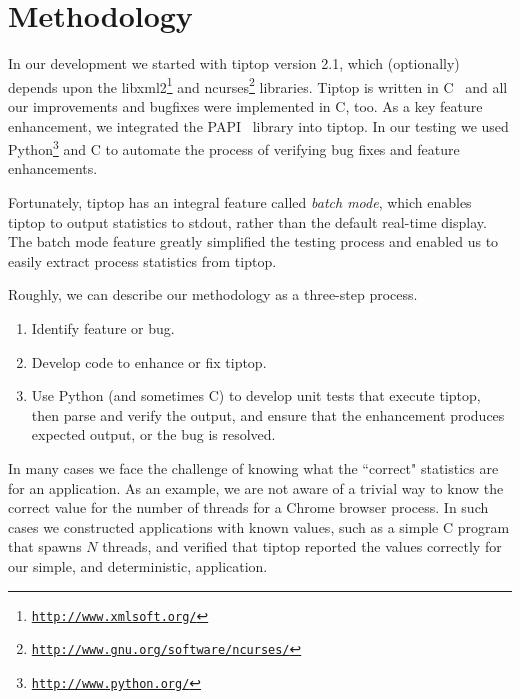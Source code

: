\section{Methodology}
\label{sec:methodology}
In our development we started with tiptop version 2.1, which (optionally) depends upon the libxml2\footnote{\texttt{\url{http://www.xmlsoft.org/}}} and ncurses\footnote{\texttt{\url{http://www.gnu.org/software/ncurses/}}} libraries.
Tiptop is written in C~\cite{Kernighan:1988:CPL:576122} and all our improvements and bugfixes were implemented in C, too.
As a key feature enhancement, we integrated the PAPI~\cite{Mucci99papi:a} library into tiptop.
In our testing we used Python\footnote{\texttt{\url{http://www.python.org/}}} and C to automate the process of verifying bug fixes and feature enhancements.

Fortunately, tiptop has an integral feature called \emph{batch mode}, which enables tiptop to output statistics to stdout, rather than the default real-time display.
The batch mode feature greatly simplified the testing process and enabled us to easily extract process statistics from tiptop.

Roughly, we can describe our methodology as a three-step process.
\begin{enumerate}
\item Identify feature or bug.
\item Develop code to enhance or fix tiptop.
\item Use Python (and sometimes C) to develop unit tests that execute tiptop, then parse and verify the output, and ensure that the enhancement produces expected output, or the bug is resolved.
\end{enumerate}

In many cases we face the challenge of knowing what the ``correct" statistics are for an application. As an example, we are not aware of a trivial way to know the correct value for the number of threads for a Chrome browser process.
In such cases we constructed applications with known values, such as a simple C program that spawns $N$ threads, and verified that tiptop reported the values correctly for our simple, and deterministic, application.